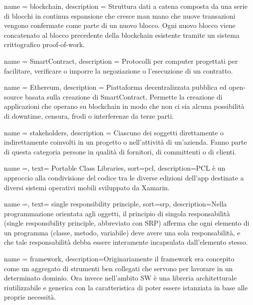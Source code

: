 {
	name = {blockchain},
	description = { Struttura dati a catena composta da una serie di blocchi in continua espansione che cresce man mano che nuove
			transazioni vengono confermate come parte di un nuovo blocco. Ogni nuovo blocco viene concatenato al blocco
			precedente della blockchain esistente tramite un sistema crittografico proof-of-work.
		}
}

{
	name = {SmartContract},
	description = { Protocolli per computer progettati per facilitare, verificare o imporre la negoziazione o l'esecuzione di un
			contratto.
		}
}

{
	name = {Ethereum},
	description = { Piattaforma decentralizzata pubblica ed open-source basata sulla creazione di
			SmartContract. Permette la creazione di applicazioni che operano su blockchain
			in modo che non ci sia alcuna possibilità di downtime, censura, frodi o interferenze
			da terze parti.
		}
}

{
	name = {stakeholders},
	description = { Ciascuno dei soggetti direttamente o indirettamente coinvolti in un progetto o nell'attività di un'azienda.
			Fanno parte di questa categoria persone in qualità di fornitori, di committenti o di clienti.
		}
}



{
    name =,
    text= Portable Class Libraries,
    sort=pcl,
    description={PCL è un approccio alla condivisione del codice tra le diverse edizioni dell’app destinate a diversi sistemi operativi mobili sviluppato da Xamarin.}
}


{
    name =,
    text= single responsibility principle,
    sort=srp,
    description={Nella programmazione orientata agli oggetti, il principio di singola responsabilità (single responsibility principle, abbreviato con SRP) afferma che ogni elemento di un programma (classe, metodo, variabile) deve avere una sola responsabilità, e che tale responsabilità debba essere interamente incapsulata dall'elemento stesso.}
}


{
    name = {framework},
    description={Originariamente il framework era concepito come un aggregato di strumenti ben collegati che servono per lavorare in un determinato dominio. Ora invece nell’ambito SW è una libreria architetturale riutilizzabile e generica con la caratteristica di poter essere istanziata in base alle proprie necessità. }
}

